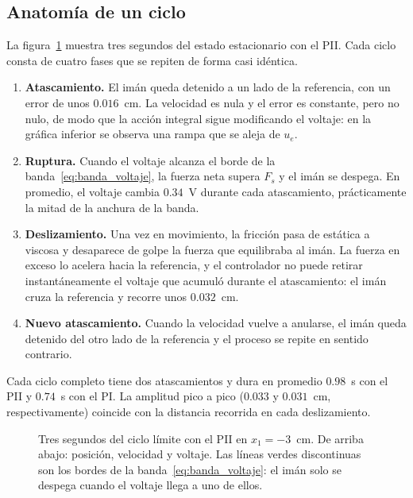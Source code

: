 \subsection{Anatomía de un ciclo}

La figura~\ref{fig:anatomia} muestra tres segundos del estado estacionario con el PII. Cada ciclo consta de cuatro fases que se repiten de forma casi idéntica.

\begin{enumerate}
  \item \textbf{Atascamiento.} El imán queda detenido a un lado de la referencia, con un error de unos $0.016$~cm. La velocidad es nula y el error es constante, pero no nulo, de modo que la acción integral sigue modificando el voltaje: en la gráfica inferior se observa una rampa que se aleja de $u_e$.
  \item \textbf{Ruptura.} Cuando el voltaje alcanza el borde de la banda~\eqref{eq:banda_voltaje}, la fuerza neta supera $F_s$ y el imán se despega. En promedio, el voltaje cambia $0.34$~V durante cada atascamiento, prácticamente la mitad de la anchura de la banda.
  \item \textbf{Deslizamiento.} Una vez en movimiento, la fricción pasa de estática a viscosa y desaparece de golpe la fuerza que equilibraba al imán. La fuerza en exceso lo acelera hacia la referencia, y el controlador no puede retirar instantáneamente el voltaje que acumuló durante el atascamiento: el imán cruza la referencia y recorre unos $0.032$~cm.
  \item \textbf{Nuevo atascamiento.} Cuando la velocidad vuelve a anularse, el imán queda detenido del otro lado de la referencia y el proceso se repite en sentido contrario.
\end{enumerate}

Cada ciclo completo tiene dos atascamientos y dura en promedio $0.98$~s con el PII y $0.74$~s con el PI. La amplitud pico a pico ($0.033$ y $0.031$~cm, respectivamente) coincide con la distancia recorrida en cada deslizamiento.

\begin{figure}[ht]
    \centering
    
    \caption[Anatomía del ciclo límite]{Tres segundos del ciclo límite con el PII en $x_1=-3$~cm. De arriba abajo: posición, velocidad y voltaje. Las líneas verdes discontinuas son los bordes de la banda~\eqref{eq:banda_voltaje}: el imán solo se despega cuando el voltaje llega a uno de ellos.}
    \label{fig:anatomia}
\end{figure}

